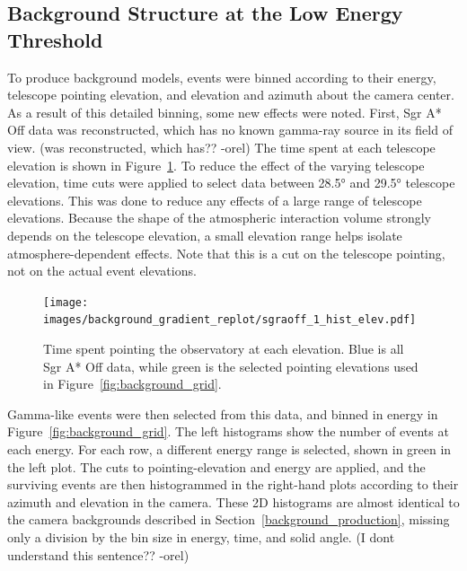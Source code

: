 \subsection{Background Structure at the Low Energy Threshold}\label{subsec:bkgstructure}
To produce background models, events were binned according to their energy, telescope pointing elevation, and elevation and azimuth about the camera center.
As a result of this detailed binning, some new effects were noted.
First, Sgr A* Off data was reconstructed, which has no known gamma-ray source in its field of view.
{\color{red}(was reconstructed, which has?? -orel)}
The time spent at each telescope elevation is shown in Figure~\ref{fig:back_elevhist}.
To reduce the effect of the varying telescope elevation, time cuts were applied to select data between \ang{28.5} and \ang{29.5} telescope elevations.
This was done to reduce any effects of a large range of telescope elevations.
Because the shape of the atmospheric interaction volume strongly depends on the telescope elevation, a small elevation range helps isolate atmosphere-dependent effects.
Note that this is a cut on the telescope pointing, not on the actual event elevations.

\begin{figure}[bt]
  \centering
  \texttt{[image: images/background\_gradient\_replot/sgraoff\_1\_hist\_elev.pdf]}
  \caption[Elevation Slice of Sgr A* Off data]{
    Time spent pointing the observatory at each elevation.
    Blue is all Sgr A* Off data, while green is the selected pointing elevations used in Figure~\ref{fig:background_grid}.
  }
  \label{fig:back_elevhist}
\end{figure}
    
Gamma-like events were then selected from this data, and binned in energy in Figure~\ref{fig:background_grid}.
The left histograms show the number of events at each energy.
For each row, a different energy range is selected, shown in green in the left plot.
The cuts to pointing-elevation and energy are applied, and the surviving events are then histogrammed in the right-hand plots according to their azimuth and elevation in the camera.
These 2D histograms are almost identical to the camera backgrounds described in Section~\ref{background_production}, missing only a division by the bin size in energy, time, and solid angle.
{\color{red}(I dont understand this sentence?? -orel)}
    
